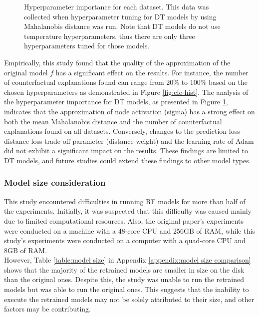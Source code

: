 \begin{figure}[]
\begin{minipage}{0.475\linewidth}
  \caption{Hyperparameter importance for each dataset. This data was collected when hyperparameter tuning for DT models by using Mahalanobis distance was run. Note that DT models do not use temperature hyperparameters, thus there are only three hyperparameters tuned for those models.}
  \label{fig:hparams importance}
 \end{minipage}
\end{figure}

Empirically, this study found that the quality of the approximation of the original model $f$ has a significant effect on the results. For instance, the number of counterfactual explanations found can range from 20\% to 100\% based on the chosen hyperparameters as demonstrated in Figure \ref{fig:cfe-hist}.
The analysis of the hyperparameter importance for DT models, as presented in Figure \ref{fig:hparams importance}, indicates that the approximation of node activation (sigma) has a strong effect on both the mean Mahalanobis distance and the number of counterfactual explanations found on all datasets. Conversely, changes to the prediction loss-distance loss trade-off parameter (distance weight) and the learning rate of Adam did not exhibit a significant impact on the results. These findings are limited to DT models, and future studies could extend these findings to other model types.

\subsubsection{Model size consideration}
\label{sec:model size}
This study encountered difficulties in running RF models for more than half of the experiments. Initially, it was suspected that this difficulty was caused mainly due to limited computational resources. Also, the original paper's experiments were conducted on a machine with a 48-core CPU and 256GB of RAM, while this study's experiments were conducted on a computer with a quad-core CPU and 8GB of RAM.\\
However, Table \ref{table:model size} in Appendix \ref{appendix:model size comparison} shows that the majority of the retrained models are smaller in size on the disk than the original ones. Despite this, the study was unable to run the retrained models but was able to run the original ones. This suggests that the inability to execute the retrained models may not be solely attributed to their size, and other factors may be contributing.

